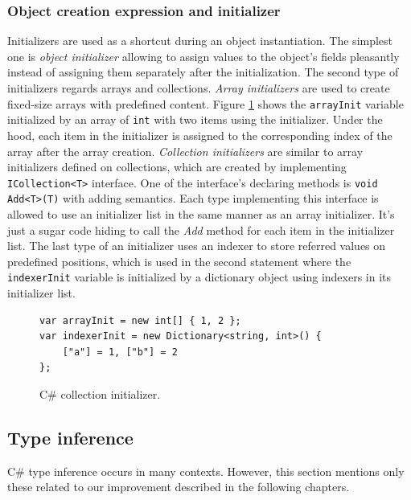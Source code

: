 \subsubsection*{Object creation expression and initializer}
Initializers are used as a shortcut during an object instantiation.
The simplest one is \textit{object initializer} allowing to assign values to the object's fields pleasantly instead of assigning them separately after the initialization.
The second type of initializers regards arrays and collections.
\textit{Array initializers} are used to create fixed-size arrays with predefined content.
Figure \ref{img07:initializer} shows the \texttt{arrayInit} variable initialized by an array of \texttt{int} with two items using the initializer.
Under the hood, each item in the initializer is assigned to the corresponding index of the array after the array creation.
\textit{Collection initializers} are similar to array initializers defined on collections, which are created by implementing \texttt{ICollection<T>} interface.
One of the interface's declaring methods is \texttt{void Add<T>(T)} with adding semantics.
Each type implementing this interface is allowed to use an initializer list in the same manner as an array initializer.
It's just a sugar code hiding to call the \textit{Add} method for each item in the initializer list.
The last type of an initializer uses an indexer to store referred values on predefined positions, which is used in the second statement where the \texttt{indexerInit} variable is initialized by a dictionary object using indexers in its initializer list.
\begin{figure}[h]
\begin{lstlisting}[style=csharp]
var arrayInit = new int[] { 1, 2 };
var indexerInit = new Dictionary<string, int>() { 
    ["a"] = 1, ["b"] = 2 
};
\end{lstlisting}
\caption{C\# collection initializer.}
\label{img07:initializer}
\end{figure}

\subsection{Type inference} \label{sect02:typeInference}

C\# type inference occurs in many contexts. 
However, this section mentions only these related to our improvement described in the following chapters.

